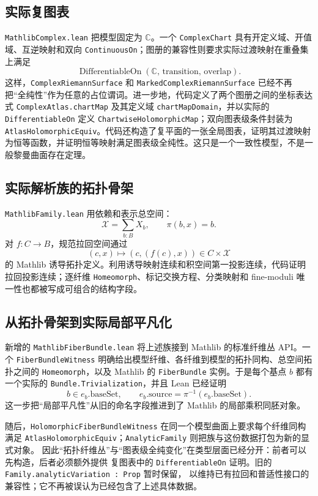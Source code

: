 \documentclass[UTF8,fontset=none,a4paper,11pt]{ctexart}
\begin{document}
\subsection{实际复图表}

\texttt{MathlibComplex.lean} 把模型固定为 \(\mathbb C\)。一个 \texttt{ComplexChart} 具有开定义域、开值域、互逆映射和双向 \texttt{ContinuousOn}；图册的兼容性则要求实际过渡映射在重叠集上满足
\[
  \operatorname{DifferentiableOn}(\mathbb C,\,\text{transition},\,\text{overlap}).
\]
这样，\texttt{ComplexRiemannSurface} 和 \texttt{MarkedComplexRiemannSurface} 已经不再把“全纯性”作为任意的占位谓词。进一步地，代码定义了两个图册之间的坐标表达式 \texttt{ComplexAtlas.chartMap} 及其定义域 \texttt{chartMapDomain}，并以实际的 \texttt{DifferentiableOn} 定义 \texttt{ChartwiseHolomorphicMap}；双向图表级条件封装为 \texttt{AtlasHolomorphicEquiv}。代码还构造了复平面的一张全局图表，证明其过渡映射为恒等函数，并证明恒等映射满足图表级全纯性。这只是一个一致性模型，不是一般黎曼曲面存在定理。

\subsection{实际解析族的拓扑骨架}

\texttt{MathlibFamily.lean} 用依赖和表示总空间：
\[
  \mathcal X=\sum_{b:B}X_b,\qquad \pi(b,x)=b.
\]
对 \(f:C\to B\)，规范拉回空间通过
\[
  (c,x)\longmapsto(c,(f(c),x))\in C\times\mathcal X
\]
的 Mathlib 诱导拓扑定义。利用诱导映射连续和积空间第一投影连续，代码证明拉回投影连续；逐纤维 \texttt{Homeomorph}、标记交换方程、分类映射和 fine-moduli 唯一性也都被写成可组合的结构字段。

\clearpage
\subsection{从拓扑骨架到实际局部平凡化}

新增的 \texttt{MathlibFiberBundle.lean} 将上述族接到 Mathlib 的标准纤维丛 API。一个
\texttt{FiberBundleWitness} 明确给出模型纤维、各纤维到模型的拓扑同构、总空间拓扑之间的
\texttt{Homeomorph}，以及 Mathlib 的 \texttt{FiberBundle} 实例。于是每个基点 $b$ 都有一个实际的
\texttt{Bundle.Trivialization}，并且 Lean 已经证明
\[
  b\in e_b.\mathrm{baseSet},
  \qquad
  e_b.\mathrm{source}=\pi^{-1}(e_b.\mathrm{baseSet}).
\]
这一步把“局部平凡性”从旧的命名字段推进到了 Mathlib 的局部乘积同胚对象。

随后，\texttt{HolomorphicFiberBundleWitness} 在同一个模型曲面上要求每个纤维同构满足
\texttt{AtlasHolomorphicEquiv}；\texttt{AnalyticFamily} 则把族与这份数据打包为新的显式对象。
因此“拓扑纤维丛”与“图表级全纯变化”在类型层面已经分开：前者可以先构造，后者必须额外提供
复图表中的 \texttt{DifferentiableOn} 证明。旧的 \texttt{Family.analyticVariation : Prop} 暂时保留，
以维持已有拉回和普适性接口的兼容性；它不再被误认为已经包含了上述具体数据。
\end{document}
